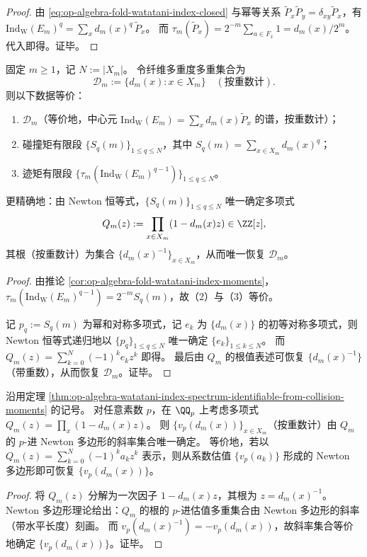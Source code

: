 \begin{proof}
由 \eqref{eq:op-algebra-fold-watatani-index-closed} 与幂等关系 \(\widetilde P_x\widetilde P_y=\delta_{xy}\widetilde P_x\)，有
\(
\mathrm{Ind}_{\mathrm{W}}(E_m)^q=\sum_x d_m(x)^q\,\widetilde P_x
\)。
而 \(\tau_m(\widetilde P_x)=2^{-m}\sum_{a\in F_x}1=d_m(x)/2^m\)。
代入即得。证毕。
\end{proof}

\begin{theorem}[碰撞矩 \texorpdfstring{$\Rightarrow$}{=>} 指数场谱的可辨识性]\label{thm:op-algebra-watatani-index-spectrum-identifiable-from-collision-moments}
固定 \(m\ge 1\)，记 \(N:=|X_m|\)。
令纤维多重度多重集合为
\[
\mathcal D_m:=\{d_m(x):x\in X_m\}\quad(\text{按重数计}).
\]
则以下数据等价：
\begin{enumerate}
  \item \(\mathcal D_m\)（等价地，中心元 \(\mathrm{Ind}_{\mathrm W}(E_m)=\sum_{x}d_m(x)\widetilde P_x\) 的谱，按重数计）；
  \item 碰撞矩有限段 \(\{S_q(m)\}_{1\le q\le N}\)，其中 \(S_q(m)=\sum_{x\in X_m}d_m(x)^q\)；
  \item 迹矩有限段 \(\{\tau_m(\mathrm{Ind}_{\mathrm W}(E_m)^{q-1})\}_{1\le q\le N}\)。
\end{enumerate}
更精确地：由 Newton 恒等式，\(\{S_q(m)\}_{1\le q\le N}\) 唯一确定多项式
\[
Q_m(z):=\prod_{x\in X_m}(1-d_m(x)z)\in\ZZ[z],
\]
其根（按重数计）为集合 \(\{d_m(x)^{-1}\}_{x\in X_m}\)，从而唯一恢复 \(\mathcal D_m\)。
\end{theorem}
\begin{proof}
由推论 \ref{cor:op-algebra-fold-watatani-index-moments}，
\(
\tau_m(\mathrm{Ind}_{\mathrm W}(E_m)^{q-1})=2^{-m}S_q(m)
\)，故（2）与（3）等价。
\par
记 \(p_q:=S_q(m)\) 为幂和对称多项式，记 \(e_k\) 为 \(\{d_m(x)\}\) 的初等对称多项式，则 Newton 恒等式递归地以 \(\{p_q\}_{1\le q\le N}\) 唯一确定 \(\{e_k\}_{1\le k\le N}\)。
而
\(
Q_m(z)=\sum_{k=0}^{N}(-1)^k e_k z^k
\)
即得。
最后由 \(Q_m\) 的根值表述可恢复 \(\{d_m(x)^{-1}\}\)（带重数），从而恢复 \(\mathcal D_m\)。证毕。
\end{proof}

\begin{proposition}\label{prop:op-algebra-watatani-index-newton-polygon-padic-audit}
沿用定理 \ref{thm:op-algebra-watatani-index-spectrum-identifiable-from-collision-moments} 的记号。
对任意素数 \(p\)，在 \(\QQ_p\) 上考虑多项式 \(Q_m(z)=\prod_{x}(1-d_m(x)z)\)。
则 \(\{v_p(d_m(x))\}_{x\in X_m}\)（按重数计）由 \(Q_m\) 的 \(p\)-进 Newton 多边形的斜率集合唯一确定。
等价地，若以 \(Q_m(z)=\sum_{k=0}^{N}(-1)^k a_k z^k\) 表示，则从系数估值 \(\{v_p(a_k)\}\) 形成的 Newton 多边形即可恢复 \(\{v_p(d_m(x))\}\)。
\end{proposition}
\begin{proof}
将 \(Q_m(z)\) 分解为一次因子 \(1-d_m(x)z\)，其根为 \(z=d_m(x)^{-1}\)。
Newton 多边形理论给出：\(Q_m\) 的根的 \(p\)-进估值多重集合由 Newton 多边形的斜率（带水平长度）刻画。
而 \(v_p(d_m(x)^{-1})=-v_p(d_m(x))\)，故斜率集合等价地确定 \(\{v_p(d_m(x))\}\)。证毕。
\end{proof}

